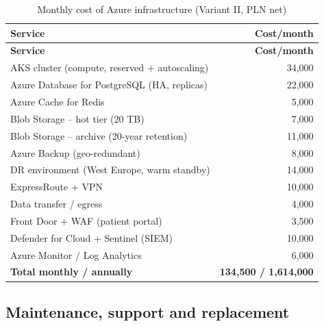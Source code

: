 \begin{longtable}{|L{10.5cm}|r|}
\caption{Monthly cost of Azure infrastructure (Variant II, PLN net)}
\label{tab:opex_chmura} \\
\hline
{}\textbf{Service} & \textbf{Cost/month} \\
\hline
\endfirsthead
\hline
{}\textbf{Service} & \textbf{Cost/month} \\
\hline
\endhead
AKS cluster (compute, reserved + autoscaling) & 34,000 \\
\hline
Azure Database for PostgreSQL (HA, replicas) & 22,000 \\
\hline
Azure Cache for Redis & 5,000 \\
\hline
Blob Storage -- hot tier (20 TB) & 7,000 \\
\hline
Blob Storage -- archive (20-year retention) & 11,000 \\
\hline
Azure Backup (geo-redundant) & 8,000 \\
\hline
DR environment (West Europe, warm standby) & 14,000 \\
\hline
ExpressRoute + VPN & 10,000 \\
\hline
Data transfer / egress & 4,000 \\
\hline
Front Door + WAF (patient portal) & 3,500 \\
\hline
Defender for Cloud + Sentinel (SIEM) & 10,000 \\
\hline
Azure Monitor / Log Analytics & 6,000 \\
\hline
{}\textbf{Total monthly / annually} & \textbf{134,500 / 1,614,000} \\
\hline
\end{longtable}

\subsection{Maintenance, support and replacement}

